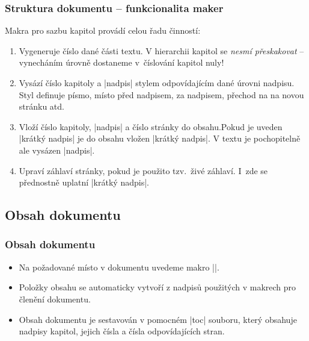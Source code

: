 \begin{frame}[fragile]
	\frametitle{Struktura dokumentu -- funkcionalita maker}
	Makra pro sazbu kapitol provádí celou řadu činností:
	\begin{enumerate}
		\item Vygeneruje číslo dané části textu. V hierarchii kapitol se \emph{nesmí přeskakovat} -- vynecháním úrovně dostaneme v~číslování kapitol nuly!
		\item Vysází číslo kapitoly a |nadpis| stylem odpovídajícím dané úrovni nadpisu. Styl definuje písmo, místo před nadpisem, za nadpisem, přechod na na novou stránku atd.
		\item Vloží číslo kapitoly, |nadpis| a číslo stránky do obsahu.Pokud je uveden |krátký nadpis| je do obsahu vložen |krátký nadpis|. V textu je pochopitelně ale vysázen |nadpis|.
		\item Upraví záhlaví stránky, pokud je použito tzv.\ živé záhlaví. I~zde se přednostně uplatní |krátký nadpis|.
	\end{enumerate}
\end{frame}




\subsection{Obsah dokumentu}
\begin{frame}
	\frametitle{Obsah dokumentu}
	\begin{itemize}
		\item Na požadované místo v dokumentu uvedeme makro |\tableofcontents|.
		\item Položky obsahu se automaticky vytvoří z nadpisů použitých v makrech pro členění dokumentu.
		\item Obsah dokumentu je sestavován v pomocném |toc| souboru, který obsahuje nadpisy kapitol, jejich čísla a čísla odpovídajících stran.
	\end{itemize}
\end{frame}


